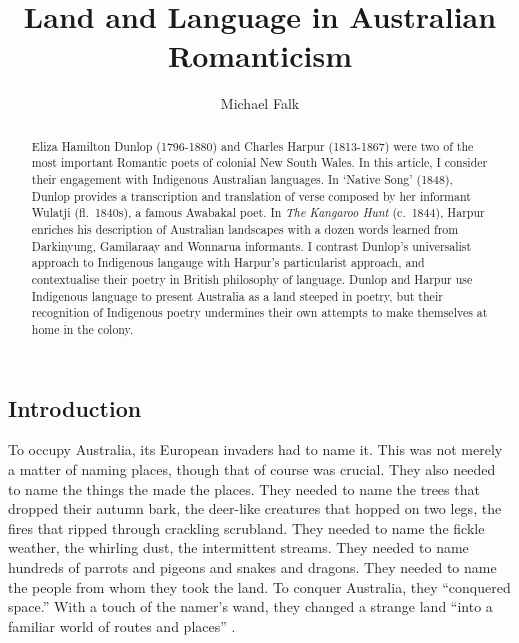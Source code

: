 \documentclass[
  Crown,
  times,
  sageh]{sagej}
\title{Land and Language in Australian Romanticism}
\author{Michael Falk\affilnum{1}}
\affiliation{
    \affilnum{1} University of Melbourne \\
  }
\renewcommand*\contentsname{Table of contents}
\newcommand\contentsname{Table of contents}
\begin{document}
\maketitle


\maketitle
\begin{abstract}
Eliza Hamilton Dunlop (1796-1880) and Charles Harpur (1813-1867) were
two of the most important Romantic poets of colonial New South Wales. In
this article, I consider their engagement with Indigenous Australian
languages. In `Native Song' (1848), Dunlop provides a transcription and
translation of verse composed by her informant Wulatji (fl.~1840s), a
famous Awabakal poet. In \emph{The Kangaroo Hunt} (c.~1844), Harpur
enriches his description of Australian landscapes with a dozen words
learned from Darkinyung, Gamilaraay and Wonnarua informants. I contrast
Dunlop's universalist approach to Indigenous langauge with Harpur's
particularist approach, and contextualise their poetry in British
philosophy of language. Dunlop and Harpur use Indigenous language to
present Australia as a land steeped in poetry, but their recognition of
Indigenous poetry undermines their own attempts to make themselves at
home in the colony.
\end{abstract}

\renewcommand*\contentsname{Table of contents}
{
\hypersetup{linkcolor=}
\setcounter{tocdepth}{3}
\tableofcontents
}
\subsection{Introduction}\label{introduction}

To occupy Australia, its European invaders had to name it. This was not
merely a matter of naming places, though that of course was crucial.
They also needed to name the things the made the places. They needed to
name the trees that dropped their autumn bark, the deer-like creatures
that hopped on two legs, the fires that ripped through crackling
scrubland. They needed to name the fickle weather, the whirling dust,
the intermittent streams. They needed to name hundreds of parrots and
pigeons and snakes and dragons. They needed to name the people from whom
they took the land. To conquer Australia, they ``conquered space.'' With
a touch of the namer's wand, they changed a strange land ``into a
familiar world of routes and places'' \citep[83]{tuan_space_1977}.
\end{document}
